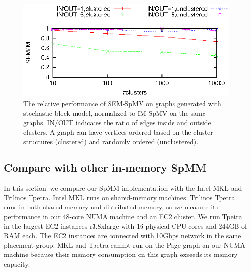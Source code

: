\begin{figure}
	\begin{center}
		\footnotesize
		\includegraphics[scale=1]{SpMM_figs/spmm-sbm.eps}
		\caption{The relative performance of SEM-SpMV on graphs generated with
			stochastic block model, normalized to IM-SpMV on the same graphs.
			IN/OUT indicates the ratio of edges inside and outside clusters.
			A graph can have vertices ordered based on the cluster structures
		(clustered) and randomly ordered (unclustered).}
		\label{perf:spmm_sbm}
	\end{center}
\end{figure}

\subsection{Compare with other in-memory SpMM}
In this section, we compare our SpMM implementation with the Intel MKL and
Trilinos Tpetra. Intel MKL runs on shared-memory machines. Trilinos Tpetra runs in
both shared memory and distributed memory, so we measure its performance in
our 48-core NUMA machine and an EC2 cluster. We run Tpetra in the largest
EC2 instances r3.8xlarge with 16 physical CPU cores and 244GB of RAM each.
The EC2 instances are connected with 10Gbps network in the same placement
group. MKL and Tpetra cannot run on the Page graph on our NUMA machine because
their memory consumption on this graph exceeds its memory capacity.

